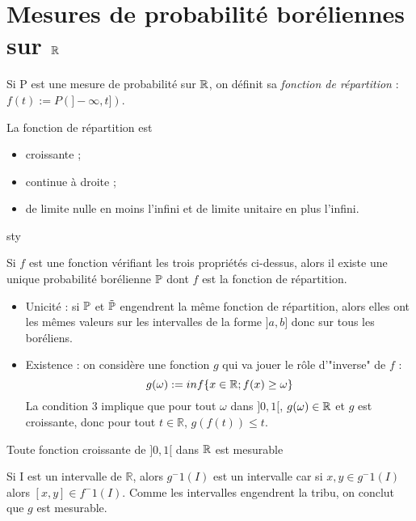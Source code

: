 \documentclass[10pt,a4paper,notitlepage ]{report}
\begin{document}
\section{Mesures de probabilité boréliennes sur $\mathbb R$} 

Si P est une mesure de probabilité sur $\mathbb R$, on définit sa \emph{fonction de répartition} : $f(t) := P ( ]- \infty , t ] ) $.

\begin{propriete}

La fonction de répartition est 

	\begin{itemize}
		\item croissante ;
		\item continue à droite ;
		\item de limite nulle en moins l'infini et de limite unitaire en plus l'infini.
	\end{itemize}

\end{propriete}

sty\begin{theorem}
Si $f$ est une fonction vérifiant les trois propriétés ci-dessus, alors il existe une unique probabilité borélienne $\mathbb P$ dont $f$ est la fonction de répartition.
\end{theorem}

\begin{demo}
\begin{itemize}
	\item Unicité : si $\mathbb P$ et $\tilde{\mathbb P}$ engendrent la même fonction de répartition, alors elles ont les mêmes valeurs sur les intervalles de la forme $]a,b]$ donc sur tous les boréliens.
	\item Existence : on considère une fonction $g$ qui va jouer le rôle d'"inverse" de $f$ : \[g(\omega) := inf \lbrace x \in \mathbb R ; f(x) \geq \omega \rbrace\]
	La condition 3 implique que pour tout $\omega$ dans $]0,1[$, $g(\omega ) \in \mathbb R$ et $g$ est croissante, donc pour tout $t \in \mathbb{R} $, $ g(f(t)) \leq t$. 	
\end{itemize}
\end{demo}

\begin{lemme}
Toute fonction croissante de $]0,1[$ dans $\mathbb R$ est mesurable 
\end{lemme}

\begin{demo}

Si I est un intervalle de $\mathbb{R}$, alors $ g^-1 (I) $ est un intervalle car si $x,y \in g^-1 (I) $ alors $[x,y] \in f^-1 (I) $. Comme les intervalles engendrent la tribu, on conclut que $g$ est mesurable. 

\end{demo}
\end{document}
